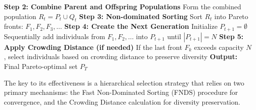 \documentclass[11pt,pdflatex,sn-mathphys-ay]{sn-jnl}%
\theoremstyle{definition}
\theoremstyle{thmstyleone}%
\theoremstyle{thmstyletwo}%
\theoremstyle{thmstylethree}%
\begin{document}
\begin{appendices}
\begin{algorithm}[H]
\begin{algorithmic}[1]
				\STATE \textbf{Step 2: Combine Parent and Offspring Populations}
				\STATE \hspace{1em} Form the combined population $R_t = P_t \cup Q_t$
				\STATE \textbf{Step 3: Non-dominated Sorting}
				\STATE \hspace{1em} Sort $R_t$ into Pareto fronts: $F_1, F_2, F_3, \dots$
				\STATE \textbf{Step 4: Create the Next Generation}
				\STATE \hspace{1em} Initialize $P_{t+1} = \emptyset$
				\STATE \hspace{1em} Sequentially add individuals from $F_1, F_2, \dots$ into $P_{t+1}$ until $|P_{t+1}| = N$
				\STATE \textbf{Step 5: Apply Crowding Distance (if needed)}
				\STATE \hspace{1em} If the last front $F_k$ exceeds capacity $N$, select individuals based on crowding distance to preserve diversity
				\ENDFOR
				\STATE \textbf{Output:} Final Pareto-optimal set $P_T$
			\end{algorithmic}
		\end{algorithm}
		The key to its effectiveness is a hierarchical selection strategy that relies on two primary mechanisms: the Fast Non-Dominated Sorting (FNDS) procedure for convergence, and the Crowding Distance calculation for diversity preservation.
		
	\end{appendices}
\end{document}

